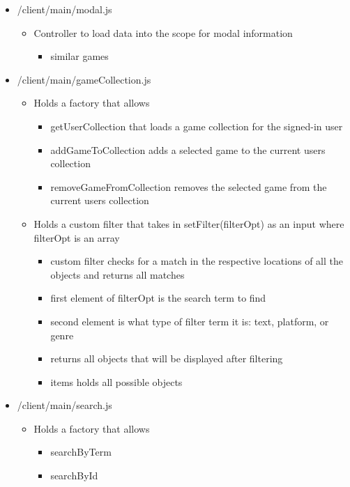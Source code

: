 \documentclass{article}
\begin{document}
\begin{itemize}
\begin{itemize}
  \end{itemize}
  \item /client/main/modal.js
  \begin{itemize}
    \item Controller to load data into the scope for modal information
    \begin{itemize}
      \item similar games
    \end{itemize}
  \end{itemize}
  \item /client/main/gameCollection.js
  \begin{itemize}
    \item Holds a factory that allows
    \begin{itemize}
      \item getUserCollection that loads a game collection for the signed-in user
      \item addGameToCollection adds a selected game to the current users collection
      \item removeGameFromCollection removes the selected game from the current users collection
    \end{itemize}
    \item Holds a custom filter that takes in setFilter(filterOpt) as an input where filterOpt is an array
    \begin{itemize}
      \item custom filter checks for a match in the respective locations of all the objects and returns all matches
      \item first element of filterOpt is the search term to find
      \item second element is what type of filter term it is: text, platform, or genre
      \item returns all objects that will be displayed after filtering
      \item items holds all possible objects
    \end{itemize}
  \end{itemize}
  \item /client/main/search.js
  \begin{itemize}
    \item Holds a factory that allows
    \begin{itemize}
      \item searchByTerm
      \item searchById
    \end{itemize}
  \end{itemize}
\end{itemize}
\end{document}
